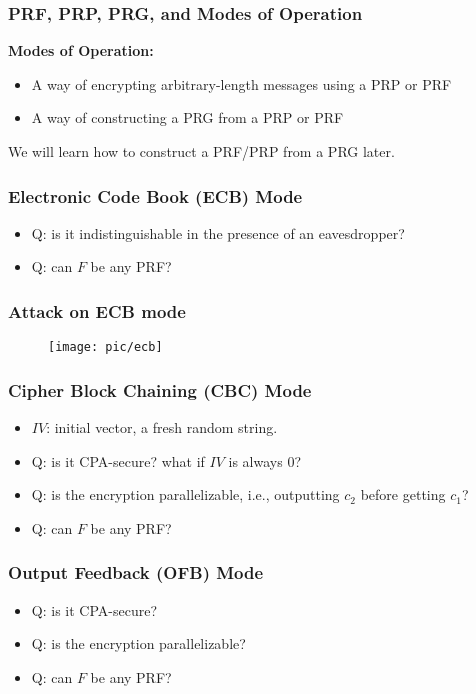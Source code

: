 \begin{frame}\frametitle{PRF, PRP, PRG, and Modes of Operation}
\textbf{Modes of Operation:}
\begin{itemize} 
\item A way of encrypting arbitrary-length messages using a PRP or PRF
\item A way of constructing a PRG from a PRP or PRF
\end{itemize}
We will learn how to construct a PRF/PRP from a PRG later.
\end{frame}
\begin{frame}\frametitle{Electronic Code Book (ECB) Mode}
\begin{figure}
\begin{center}

\end{center}
\end{figure}
\begin{itemize}
\item \alert{Q: is it indistinguishable in the presence of an eavesdropper?}
\item \alert{Q: can $F$ be any PRF?}
\end{itemize}
\end{frame}
\begin{frame}\frametitle{Attack on ECB mode}
\begin{figure}
\begin{center}
\texttt{[image: pic/ecb]} 
\end{center}
\end{figure}
\end{frame}
\begin{frame}\frametitle{Cipher Block Chaining (CBC) Mode}
\begin{figure}
\begin{center}

\end{center}
\end{figure}
\begin{itemize}
\item $IV$: initial vector, a fresh random string.
\item \alert{Q: is it CPA-secure? what if $IV$ is always $0$?}
\item \alert{Q: is the encryption parallelizable, i.e., outputting $c_{2}$ before getting $c_{1}$?}
\item \alert{Q: can $F$ be any PRF?}
\end{itemize}
\end{frame}
\begin{frame}\frametitle{Output Feedback (OFB) Mode}
\begin{figure}
\begin{center}

\end{center}
\end{figure}
\begin{itemize}
\item \alert{Q: is it CPA-secure?}
\item \alert{Q: is the encryption parallelizable?}
\item \alert{Q: can $F$ be any PRF?}
\end{itemize}
\end{frame}
